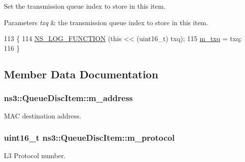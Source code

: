 Set the transmission queue index to store in this item. 


\begin{DoxyParams}{Parameters}
{\em txq} & the transmission queue index to store in this item. \\
\hline
\end{DoxyParams}

\begin{DoxyCode}
113 \{
114   \hyperlink{log-macros-disabled_8h_a90b90d5bad1f39cb1b64923ea94c0761}{NS\_LOG\_FUNCTION} (\textcolor{keyword}{this} << (uint16\_t) txq);
115   \hyperlink{classns3_1_1QueueDiscItem_a109c7b6161c715175d5c7f7b6e423aa4}{m\_txq} = txq;
116 \}
\end{DoxyCode}


\subsection{Member Data Documentation}
\subsubsection[{\texorpdfstring{m\+\_\+address}{m_address}}]{ ns3\+::\+Queue\+Disc\+Item\+::m\+\_\+address\hspace{0.3cm}{\ttfamily [private]}}\hypertarget{classns3_1_1QueueDiscItem_a429aff942058a8f504346937e9cf06d4}{}\label{classns3_1_1QueueDiscItem_a429aff942058a8f504346937e9cf06d4}


M\+AC destination address. 

\subsubsection[{\texorpdfstring{m\+\_\+protocol}{m_protocol}}]{\setlength{\rightskip}{0pt plus 5cm}uint16\+\_\+t ns3\+::\+Queue\+Disc\+Item\+::m\+\_\+protocol\hspace{0.3cm}{\ttfamily [private]}}\hypertarget{classns3_1_1QueueDiscItem_a4c4393e03f5a0d0d65f603f6c9347c4c}{}\label{classns3_1_1QueueDiscItem_a4c4393e03f5a0d0d65f603f6c9347c4c}


L3 Protocol number. 

